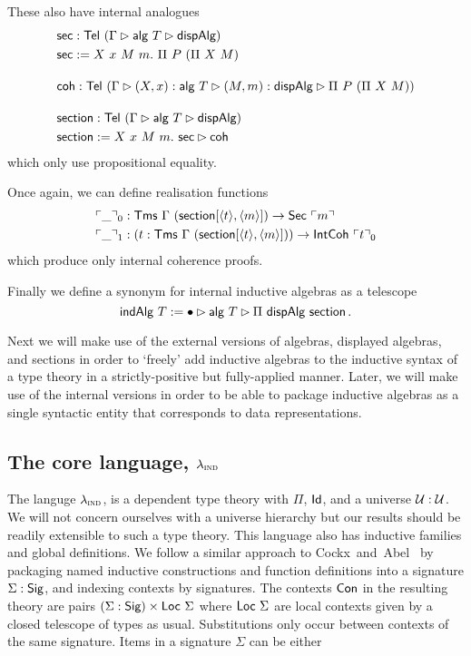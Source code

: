 These also have internal analogues
\begin{align*}
    &\textsf{sec} : \textsf{Tel}\ (\Gamma \rhd \textsf{alg}\ T \rhd \textsf{dispAlg}) \\
    &\textsf{sec} := X\ x\ M\ m.\ \Pi\ P\ (\Pi\ X\ M) \\[1em]
    &\textsf{coh} : \textsf{Tel}\ (\Gamma \rhd (X, x) : \textsf{alg}\ T\rhd (M, m) : \textsf{dispAlg} \rhd \Pi\ P\ (\Pi\ X\ M)) \\[1em]
    &\textsf{section} : \textsf{Tel}\ (\Gamma \rhd \textsf{alg}\ T \rhd \textsf{dispAlg}) \\
    &\textsf{section} := X\ x\ M\ m.\ \textsf{sec} \rhd \textsf{coh}
\end{align*}
which only use propositional equality.

Once again, we can define realisation functions
\begin{align*}
    &\emb{\_}_0 : \Tms\ \Gamma\ (\mta{section}[\Msub{t},\Msub{m}]) \to \mta{Sec}\ \emb{m} \\
    &\emb{\_}_1 : (t : \Tms\ \Gamma\ (\mta{section}[\Msub{t},\Msub{m}])) \to \mta{IntCoh}\ \emb{t}_0
\end{align*}
which produce only internal coherence proofs.

Finally we define a synonym for internal inductive algebras as a telescope
\[
    \textsf{indAlg}\ T := \bullet \rhd \textsf{alg}\ T \rhd \Pi\ \textsf{dispAlg}\ \textsf{section} \,.
\]

Next we will make use of the external versions of algebras, displayed algebras,
and sections in order to `freely' add inductive algebras to the inductive syntax
of a type theory in a strictly-positive but fully-applied manner. Later, we will
make use of the internal versions in order to be able to package inductive
algebras as a single syntactic entity that corresponds to data
representations.

\subsection{The core language, $\lambda_{\textsc{ind}}$}\label{sub:lambdaind}

The languge $\lambda_{\textsc{ind}}$, is a dependent type theory with $\Pi$, $\textsf{Id}$, and
a universe $\mathcal{U} : \mathcal{U}$. We will not concern ourselves with a universe
hierarchy but our results should be readily extensible to such a type theory.
This language also has inductive families and global definitions. We follow a
similar approach
to Cockx~and~Abel~\cite{Cockx2018-fk} by packaging named inductive constructions
and function definitions into a signature $\Sigma : \textsf{Sig}$, and indexing contexts
by signatures. The contexts $\textsf{Con}$ in the resulting theory are pairs $(\Sigma :
\textsf{Sig}) \times \textsf{Loc}\ \Sigma$ where $\Loc\ \Sigma$ are local contexts given by a
closed telescope of types as usual. Substitutions only occur between contexts of
the same signature. Items in a signature $\Sigma$ can be either

